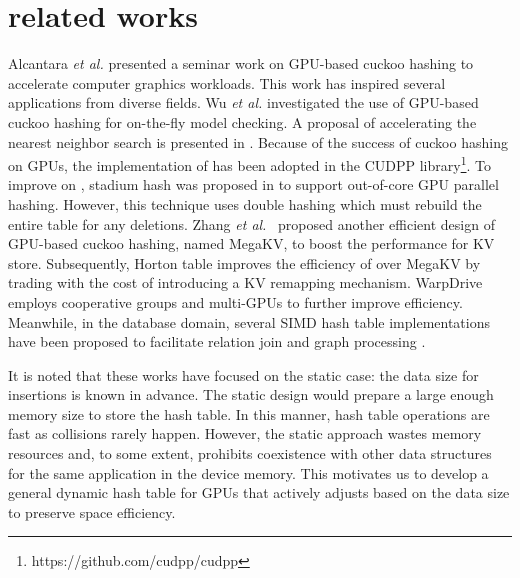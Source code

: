 \section{related works}\label{sec:rel}
Alcantara \textit{et al.} \cite{alcantara2009real} presented a seminar work on GPU-based cuckoo hashing to accelerate computer graphics workloads. 
This work has inspired several applications from diverse fields. Wu \textit{et al.} \cite{wu2015gpu} investigated the use of GPU-based cuckoo hashing for on-the-fly model checking. 
A proposal of accelerating the nearest neighbor search is presented in \cite{pan2010efficient}. 
Because of the success of cuckoo hashing on GPUs, the implementation of \cite{alcantara2009real} has been adopted in the CUDPP library\footnote{https://github.com/cudpp/cudpp}.
To improve on \cite{alcantara2009real}, stadium hash was proposed in \cite{khorasani2015stadium} to support out-of-core GPU parallel hashing. However, this technique uses double hashing which must rebuild the entire table for any deletions.  
Zhang \textit{et al.}~\cite{zhang2015mega} proposed another efficient design of GPU-based cuckoo hashing, named MegaKV, 
to boost the performance for KV store. 
Subsequently, Horton table \cite{breslow2016horton} improves the efficiency of  over MegaKV by trading with the cost of introducing a KV remapping mechanism.
WarpDrive \cite{junger2018warpdrive} employs cooperative groups and multi-GPUs to further improve efficiency.
Meanwhile, in the database domain, several SIMD hash table implementations have been proposed to facilitate relation join and graph processing \cite{ross2007efficient,zhong2014medusa}. 

It is noted that these works have focused on the static case: the data size for insertions is known in advance. The static design would prepare a large enough memory size to store the hash table. In this manner, hash table operations are fast as collisions rarely happen. However, the static approach wastes memory resources and, to some extent, prohibits coexistence with other data structures for the same application in the device memory. 
This motivates us to develop a general dynamic hash table for GPUs that actively adjusts based on the data size to preserve space efficiency. 

